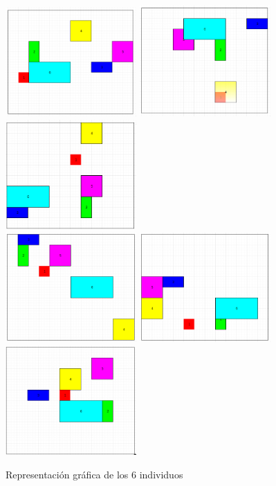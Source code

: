\documentclass[a4paper]{article}
\begin{document}
\begin{figure}[h]
\includegraphics[width=5cm]{./pics/indiv1.png}
\includegraphics[width=5cm]{./pics/indiv2.png}
\includegraphics[width=5cm]{./pics/indiv3.png} \\
\includegraphics[width=5cm]{./pics/indiv4.png}
\includegraphics[width=5cm]{./pics/indiv5.png}
\includegraphics[width=5cm]{./pics/indiv6.png}
\caption{Representación gráfica de los 6 individuos}
\end{figure}
\end{document}
